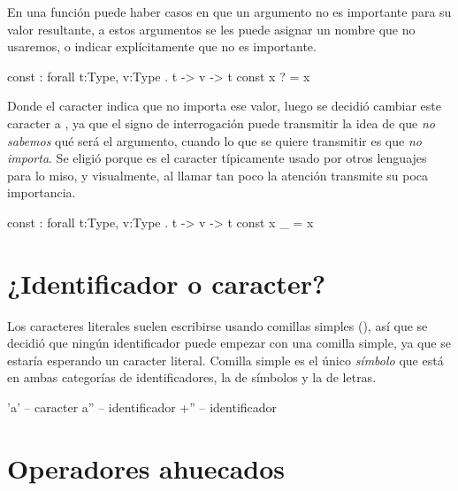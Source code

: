 \begin{designfr}
En una función puede haber casos en que un argumento no es importante para su valor resultante, a estos argumentos se les puede asignar un nombre que no usaremos, o indicar explícitamente que no es importante.

\begin{anglercode}
const : forall t:Type, v:Type . t -> v -> t
const x ? = x
\end{anglercode}

Donde el caracter  indica que no importa ese valor, luego se decidió cambiar este caracter a \inlinecode{\_}, ya que el signo de interrogación puede transmitir la idea de que \emph{no sabemos} qué será el argumento, cuando lo que se quiere transmitir es que \emph{no importa}. Se eligió \inlinecode{\_} porque es el caracter típicamente usado por otros lenguajes para lo miso, y visualmente, al llamar tan poco la atención transmite su poca importancia.

\begin{anglercode}
const : forall t:Type, v:Type . t -> v -> t
const x _ = x
\end{anglercode}
\end{designfr}

\section{¿Identificador o caracter?}

\begin{designfr}
Los caracteres literales suelen escribirse usando comillas simples (), así que se decidió que ningún identificador puede empezar con una comilla simple, ya que se estaría esperando un caracter literal. Comilla simple es el único \emph{símbolo} que está en ambas categorías de identificadores, la de símbolos y la de letras.

\begin{anglercode}
'a'     -- caracter
a''     -- identificador
+''     -- identificador
\end{anglercode}
\end{designfr}

\section{Operadores ahuecados}

